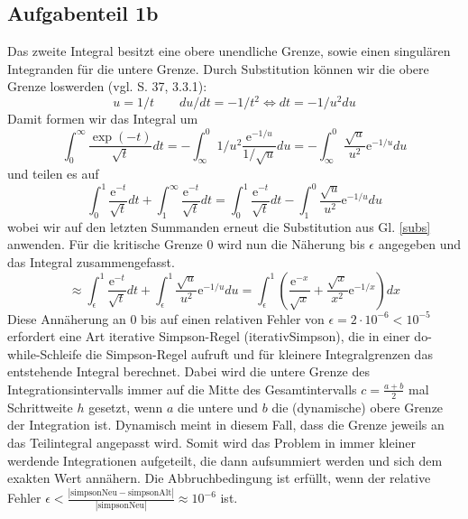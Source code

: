 \subsection*{Aufgabenteil 1b}
Das zweite Integral besitzt eine obere unendliche Grenze, sowie einen singulären Integranden für die untere Grenze.
Durch Substitution können wir die obere Grenze loswerden (vgl. S. 37, 3.3.1):
\begin{equation}
u = 1/t \qquad du/dt = - 1/t^2 \Leftrightarrow dt = -1/u^2 du
\label{subs}
\end{equation}
Damit formen wir das Integral um
\begin{equation*}
\int_0^{\infty} \frac{\exp(-t)}{\sqrt{t}}dt = - \int_{\infty}^0 1/u^2 \frac{\mathup{e}^{-1/u}}{1/\sqrt{u}} du= - \int_{\infty}^0 \frac{\sqrt{u}}{u^2} \mathup{e}^{-1/u} du
\end{equation*}
und teilen es auf
\begin{equation*}
\int_0^1 \frac{\mathup{e}^{-t}}{\sqrt{t}} dt + \int_1^{\infty} \frac{\mathup{e}^{-t}}{\sqrt{t}}dt = \int_0^1 \frac{\mathup{e}^{-t}}{\sqrt{t}} dt - \int_{1}^0 \frac{\sqrt{u}}{u^2} \mathup{e}^{-1/u} du
\end{equation*}
wobei wir auf den letzten Summanden erneut die Substitution aus Gl. \eqref{subs} anwenden. Für die kritische Grenze 0 wird nun die Näherung bis $\epsilon$ angegeben und das Integral zusammengefasst.
\begin{equation*}
\approx \int_{\epsilon}^1 \frac{\mathup{e}^{-t}}{\sqrt{t}} dt+ \int_{\epsilon}^1 \frac{\sqrt{u}}{u^2} \mathup{e}^{-1/u} du = \int_{\epsilon}^1 \left(\frac{\mathup{e}^{-x}}{\sqrt{x}}+ \frac{\sqrt{x}}{x^2} \mathup{e}^{-1/x}\right) dx
\end{equation*}
Diese Annäherung an 0 bis auf einen relativen Fehler von $\epsilon = 2 \cdot 10^{-6} < 10^{-5}$ erfordert eine Art iterative Simpson-Regel (iterativSimpson), die in einer do-while-Schleife die Simpson-Regel aufruft und für kleinere Integralgrenzen das entstehende Integral berechnet. Dabei wird die untere Grenze des Integrationsintervalls immer auf die Mitte des Gesamtintervalls $c = \frac{a+b}{2}$ mal Schrittweite $h$ gesetzt, wenn $a$ die untere und $b$ die (dynamische) obere Grenze der Integration ist. Dynamisch meint in diesem Fall, dass die Grenze jeweils an das Teilintegral angepasst wird. Somit wird das Problem in immer kleiner werdende Integrationen aufgeteilt, die dann aufsummiert werden und sich dem exakten Wert annähern.
Die Abbruchbedingung ist erfüllt, wenn der relative Fehler $\epsilon < \frac{|\text{simpsonNeu}-\text{simpsonAlt}|}{|\text{simpsonNeu}|} \approx 10^{-6}$ ist.

